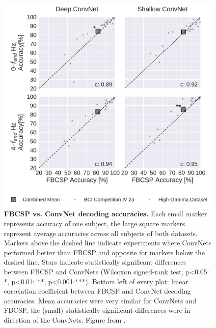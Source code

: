\begin{figure}[h!tb]
    \myfloatalign
    \includegraphics[width=0.9\linewidth]{images/Final_Comparison.ipynb.2.png}
    \caption[FBCSP vs. ConvNet decoding accuracies.]{
\textbf{FBCSP vs. ConvNet decoding accuracies.} Each small marker
represents accuracy of one subject, the large square markers represent
average accuracies across all subjects of both datasets. Markers above
the dashed line indicate experiments where ConvNets performed better
than FBCSP and opposite for markers below the dashed line. Stars
indicate statistically significant differences between FBCSP and
ConvNets (Wilcoxon signed-rank test, p\textless0.05: *, p\textless0.01:
**, p\textless0.001:***). Bottom left of every plot: linear correlation
coefficient between FBCSP and ConvNet decoding accuracies. Mean
accuracies were very similar for ConvNets and FBCSP, the (small)
statistically significant differences were in direction of the ConvNets.
Figure from \citet{schirrmeisterdeephbm2017}.
}
\label{movement-decoding-result-comparison-figure}
\end{figure}


